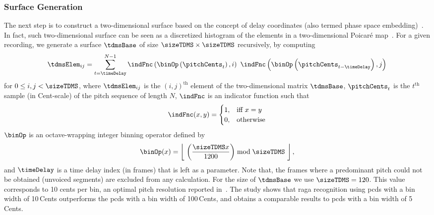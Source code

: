 \subsubsection{Surface Generation}
\label{sec:tdms_surface_generation}

The next step is to construct a two-dimensional surface based on the concept of delay coordinates (also termed phase space embedding)~\citep{takens1981detecting, Kantz04BOOK}. In fact, such two-dimensional surface can be seen as a discretized histogram of the elements in a two-dimensional Poicar\'e map~\citep{Kantz04BOOK}. For a given recording, we generate a surface $\tdmsBase$ of size $\sizeTDMS\times\sizeTDMS$ recursively, by computing
\begin{equation}
\label{eq:surface_computation1}	
\tdmsElem_{ij} = \sum_{t=\timeDelay}^{N-1} \indFnc\left(\binOp\left(\pitchCents_t\right),i\right)~ \indFnc\left(\binOp\left(\pitchCents_{t-\timeDelay}\right),j\right) 
\end{equation}
for $0 \leq i,j < \sizeTDMS$, where $\tdmsElem_{ij}$ is the $(i,j)^\mathrm{th}$ element of the two-dimensional matrix $\tdmsBase$, $\pitchCents_t$ is the $t^\mathrm{th}$ sample (in Cent-scale) of the pitch sequence of length $N$, $\indFnc$ is an indicator function such that
\begin{equation}
\begin{aligned}
\indFnc(x,y)=
\begin{cases}
1, & \text{iff } x=y\\
0, & \text{otherwise}
\end{cases}
\end{aligned}
\end{equation} 
$\binOp$ is an octave-wrapping integer binning operator defined by 
\begin{equation}	
\label{eq:binning_function}	
\binOp(x) = \left\lfloor ~\left(\frac{\sizeTDMS x}{1200}\right) \bmod \sizeTDMS ~\right\rfloor,
\end{equation}
and $\timeDelay$ is a time delay index (in frames) that is left as a parameter. Note that, the frames where a predominant pitch could not be obtained (unvoiced segments) are excluded from any calculation. For the size of $\tdmsBase$ we use $\sizeTDMS = 120$. This value  corresponds to 10 cents per bin, an optimal pitch resolution reported in~\citep{chordia2013joint}. The study shows that \gls{raga} recognition using \glspl{pcd} with a bin width of 10\,Cents outperforms the \glspl{pcd} with a bin width of 100\,Cents, and obtains a comparable results to \glspl{pcd} with a bin width of 5\,Cents.

